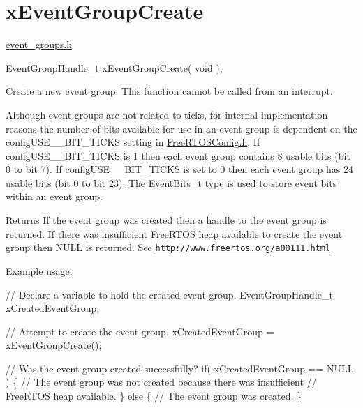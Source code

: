 \hypertarget{group__x_event_group_create}{}\section{x\+Event\+Group\+Create}
\label{group__x_event_group_create}
\hyperlink{event__groups_8h_source}{event\+\_\+groups.\+h} 
\begin{DoxyPre}
EventGroupHandle\_t xEventGroupCreate( void );
\end{DoxyPre}


Create a new event group. This function cannot be called from an interrupt.

Although event groups are not related to ticks, for internal implementation reasons the number of bits available for use in an event group is dependent on the config\+U\+S\+E\+\_\+\_\+\+B\+I\+T\+\_\+\+T\+I\+C\+K\+S setting in \hyperlink{_free_r_t_o_s_config_8h_source}{Free\+R\+T\+O\+S\+Config.\+h}. If config\+U\+S\+E\+\_\+\_\+\+B\+I\+T\+\_\+\+T\+I\+C\+K\+S is 1 then each event group contains 8 usable bits (bit 0 to bit 7). If config\+U\+S\+E\+\_\+\_\+\+B\+I\+T\+\_\+\+T\+I\+C\+K\+S is set to 0 then each event group has 24 usable bits (bit 0 to bit 23). The Event\+Bits\+\_\+t type is used to store event bits within an event group.

\begin{DoxyReturn}{Returns}
If the event group was created then a handle to the event group is returned. If there was insufficient Free\+R\+T\+O\+S heap available to create the event group then N\+U\+L\+L is returned. See \href{http://www.freertos.org/a00111.html}{\tt http\+://www.\+freertos.\+org/a00111.\+html}
\end{DoxyReturn}
Example usage\+: 
\begin{DoxyPre}
   // Declare a variable to hold the created event group.
   EventGroupHandle\_t xCreatedEventGroup;\end{DoxyPre}



\begin{DoxyPre}   // Attempt to create the event group.
   xCreatedEventGroup = xEventGroupCreate();\end{DoxyPre}



\begin{DoxyPre}   // Was the event group created successfully?
   if( xCreatedEventGroup == NULL )
   \{
    // The event group was not created because there was insufficient
    // FreeRTOS heap available.
   \}
   else
   \{
    // The event group was created.
   \}
  \end{DoxyPre}
 